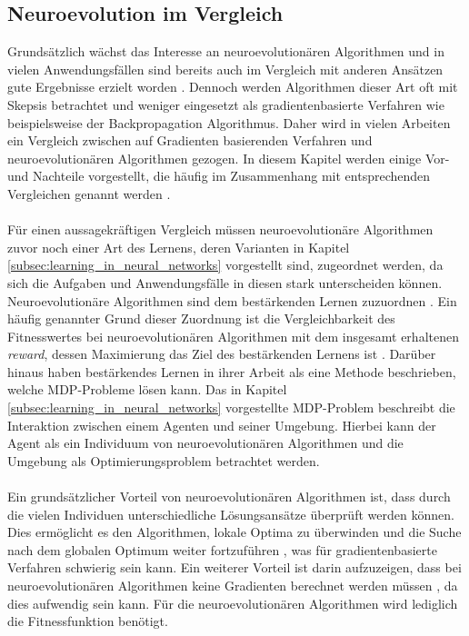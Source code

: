 \subsection{Neuroevolution im Vergleich}
\label{subsec:comparision_neuroevoltion}
Grundsätzlich wächst das Interesse an neuroevolutionären Algorithmen und in vielen Anwendungsfällen sind bereits auch im Vergleich mit anderen Ansätzen gute Ergebnisse erzielt worden \cite{meisner2009neurostrategies}. Dennoch werden Algorithmen dieser Art oft mit Skepsis betrachtet und weniger eingesetzt als gradientenbasierte Verfahren wie beispielsweise der Backpropagation Algorithmus. Daher wird in vielen Arbeiten ein Vergleich zwischen auf Gradienten basierenden Verfahren und neuroevolutionären Algorithmen gezogen. In diesem Kapitel werden einige Vor- und Nachteile vorgestellt, die häufig im Zusammenhang mit entsprechenden Vergleichen genannt werden \cite{rojas1996neural, meisner2009neurostrategies, such2017deep, whitley1993genetic}.
\\\\
Für einen aussagekräftigen Vergleich müssen neuroevolutionäre Algorithmen zuvor noch einer Art des Lernens, deren Varianten in Kapitel \ref{subsec:learning_in_neural_networks} vorgestellt sind, zugeordnet werden, da sich die Aufgaben und Anwendungsfälle in diesen stark unterscheiden können. Neuroevolutionäre Algorithmen sind dem bestärkenden Lernen zuzuordnen \cite{whitley1993genetic}. Ein häufig genannter Grund dieser Zuordnung ist die Vergleichbarkeit des Fitnesswertes bei neuroevolutionären Algorithmen mit dem insgesamt erhaltenen \emph{reward}, dessen Maximierung das Ziel des bestärkenden Lernens ist \cite{such2017deep}. Darüber hinaus haben \citeauthor{sutton2018reinforcement} bestärkendes Lernen in ihrer Arbeit als eine Methode beschrieben, welche \ac{MDP}-Probleme lösen kann. Das in Kapitel \ref{subsec:learning_in_neural_networks} vorgestellte \ac{MDP}-Problem beschreibt die Interaktion zwischen einem Agenten und seiner Umgebung. Hierbei kann der Agent als ein Individuum von neuroevolutionären Algorithmen und die Umgebung als Optimierungsproblem betrachtet werden. 
\\\\
Ein grundsätzlicher Vorteil von neuroevolutionären Algorithmen ist, dass durch die vielen Individuen unterschiedliche Lösungsansätze überprüft werden können. Dies ermöglicht es den Algorithmen, lokale Optima zu überwinden und die Suche nach dem globalen Optimum weiter fortzuführen \cite{rojas1996neural}, was für gradientenbasierte Verfahren schwierig sein kann. Ein weiterer Vorteil ist darin aufzuzeigen, dass bei neuroevolutionären Algorithmen keine Gradienten berechnet werden müssen \cite{rojas1996neural}, da dies aufwendig sein kann. Für die neuroevolutionären Algorithmen wird lediglich die Fitnessfunktion benötigt. 
